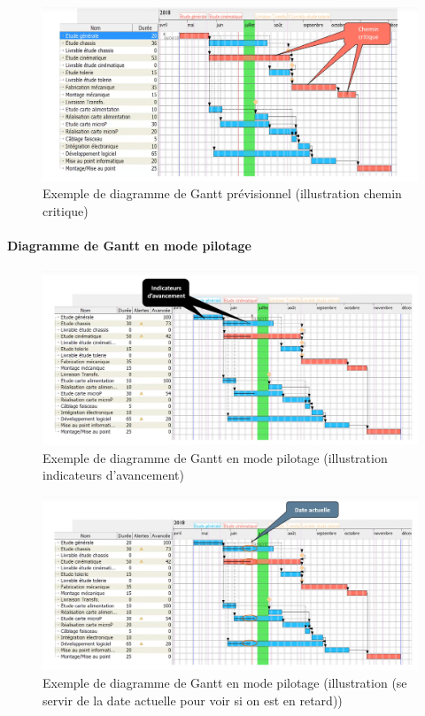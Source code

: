 \begin{figure}[!h]
	\begin{center}
		\includegraphics[scale=0.2]{images/exemple_diagramme_gantt2.png}
		\caption{Exemple de diagramme de Gantt prévisionnel (illustration chemin critique)}
	\end{center}
\end{figure}
\paragraph*{Diagramme de Gantt en mode pilotage}
\begin{figure}[!h]
	\begin{center}
		\includegraphics[scale=0.2]{images/diagramme_gantt_pilotage1.png}
		\caption{Exemple de diagramme de Gantt en mode pilotage (illustration indicateurs d'avancement)}
	\end{center}
\end{figure}
\begin{figure}[!h]
	\begin{center}
		\includegraphics[scale=0.2]{images/diagramme_gantt_pilotage.png}
		\caption{Exemple de diagramme de Gantt en mode pilotage (illustration (se servir de la date actuelle pour voir si on est en retard))}
	\end{center}
\end{figure}
